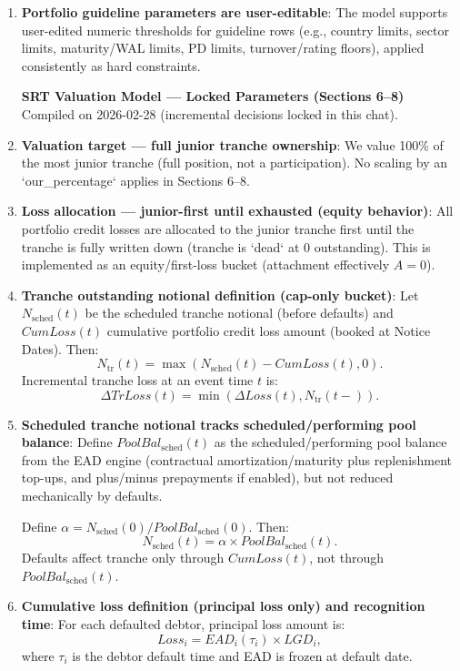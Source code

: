 \documentclass[11pt]{article}
\begin{document}
\begin{enumerate}[label=\arabic*),leftmargin=*,align=left]
\item \textbf{Portfolio guideline parameters are user-editable}: The model supports user-edited numeric thresholds for guideline rows (e.g., country limits, sector limits, maturity/WAL limits, PD limits, turnover/rating floors), applied consistently as hard constraints.

\vspace{1em}
\noindent \textbf{SRT Valuation Model — Locked Parameters (Sections 6–8)} \\
Compiled on 2026-02-28 (incremental decisions locked in this chat).
\vspace{0.5em}

\item \textbf{Valuation target — full junior tranche ownership}: We value 100\% of the most junior tranche (full position, not a participation). No scaling by an `our_percentage` applies in Sections 6–8.

\item \textbf{Loss allocation — junior-first until exhausted (equity behavior)}: All portfolio credit losses are allocated to the junior tranche first until the tranche is fully written down (tranche is `dead` at 0 outstanding). This is implemented as an equity/first-loss bucket (attachment effectively $A = 0$).

\item \textbf{Tranche outstanding notional definition (cap-only bucket)}: Let $N_{\text{sched}}(t)$ be the scheduled tranche notional (before defaults) and $CumLoss(t)$ cumulative portfolio credit loss amount (booked at Notice Dates). Then:
\[ N_{\text{tr}}(t) = \max(N_{\text{sched}}(t) - CumLoss(t), 0). \]
Incremental tranche loss at an event time $t$ is:
\[ \Delta TrLoss(t) = \min(\Delta Loss(t), N_{\text{tr}}(t-)). \]

\item \textbf{Scheduled tranche notional tracks scheduled/performing pool balance}: Define $PoolBal_{\text{sched}}(t)$ as the scheduled/performing pool balance from the EAD engine (contractual amortization/maturity plus replenishment top-ups, and plus/minus prepayments if enabled), but not reduced mechanically by defaults.

Define $\alpha = N_{\text{sched}}(0) / PoolBal_{\text{sched}}(0)$. Then:
\[ N_{\text{sched}}(t) = \alpha \times PoolBal_{\text{sched}}(t). \]
Defaults affect tranche only through $CumLoss(t)$, not through $PoolBal_{\text{sched}}(t)$.

\item \textbf{Cumulative loss definition (principal loss only) and recognition time}: For each defaulted debtor, principal loss amount is:
\[ Loss_i = EAD_i(\tau_i) \times LGD_i, \]
where $\tau_i$ is the debtor default time and EAD is frozen at default date.


\end{enumerate}
\end{document}
